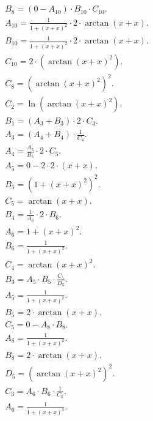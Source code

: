 \documentclass[12pt,a4paper]{extreport}
\begin{document}
\begin{multline}
\\
B_{8} = (0 - A_{10}) \cdot B_{10} \cdot C_{10}.\\
A_{10} = \frac{1}{1 + (x + x) ^ {2}} \cdot 2 \cdot \arctan(x + x).\\
B_{10} = \frac{1}{1 + (x + x) ^ {2}} \cdot 2 \cdot \arctan(x + x).\\
C_{10} = 2 \cdot (\arctan(x + x) ^ {2}).\\
C_{8} = (\arctan(x + x) ^ {2}) ^ {2}.\\
C_{2} = \ln(\arctan(x + x) ^ {2}).\\
B_{1} = (A_{3} + B_{3}) \cdot 2 \cdot C_{3}.\\
A_{3} = (A_{4} + B_{4}) \cdot \frac{1}{C_{4}}.\\
A_{4} = \frac{A_{5}}{B_{5}} \cdot 2 \cdot C_{5}.\\
A_{5} = 0 - 2 \cdot 2 \cdot (x + x).\\
B_{5} = (1 + (x + x) ^ {2}) ^ {2}.\\
C_{5} = \arctan(x + x).\\
B_{4} = \frac{1}{A_{6}} \cdot 2 \cdot B_{6}.\\
A_{6} = 1 + (x + x) ^ {2}.\\
B_{6} = \frac{1}{1 + (x + x) ^ {2}}.\\
C_{4} = \arctan(x + x) ^ {2}.\\
B_{3} = A_{5} \cdot B_{5} \cdot \frac{C_{5}}{D_{5}}.\\
A_{5} = \frac{1}{1 + (x + x) ^ {2}}.\\
B_{5} = 2 \cdot \arctan(x + x).\\
C_{5} = 0 - A_{8} \cdot B_{8}.\\
A_{8} = \frac{1}{1 + (x + x) ^ {2}}.\\
B_{8} = 2 \cdot \arctan(x + x).\\
D_{5} = (\arctan(x + x) ^ {2}) ^ {2}.\\
C_{3} = A_{6} \cdot B_{6} \cdot \frac{1}{C_{6}}.\\
A_{6} = \frac{1}{1 + (x + x) ^ {2}}.\\
\end{multline}
\end{document}

